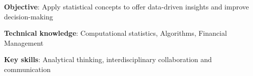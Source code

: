 \textbf{Objective}: Apply statistical concepts to offer data-driven insights and improve decision-making

\textbf{Technical knowledge}: Computational statistics, Algorithms, Financial Management

{\bf Key skills}: Analytical thinking, interdisciplinary collaboration and communication%

